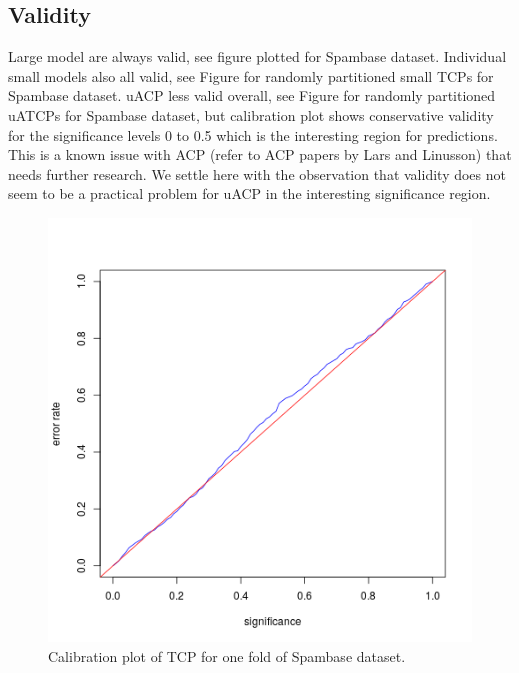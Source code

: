 \documentclass[main]{subfiles}
\begin{document}
\subsection{Validity}
Large model are always valid, see figure  plotted for Spambase dataset. Individual small models also all valid, see Figure for randomly partitioned small TCPs for Spambase dataset. uACP less valid overall, see Figure for randomly partitioned uATCPs for Spambase dataset, but calibration plot shows conservative validity for the significance levels 0 to 0.5 which is the interesting region for predictions. This is a known issue with ACP (refer to ACP papers by Lars and Linusson) that needs further research. We settle here with the observation that validity does not seem to be a practical problem for uACP in the interesting significance region.

\begin{figure}[H]
\begin{center}
  \includegraphics[scale=0.6]{images/pooledCalibrationPlot}
 \caption{Calibration plot of TCP for one fold of Spambase dataset.}\label{fig:pooledCalibrationPlot}
\end{center}
\end{figure}
\end{document}
